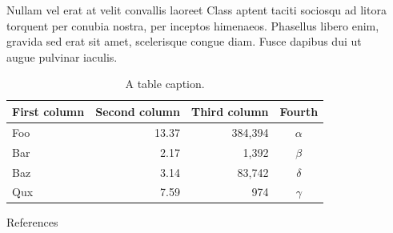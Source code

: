 \documentclass[final]{beamer}
\newlength{\sepwidth}
\newlength{\colwidth}
\newcommand{\separatorcolumn}{\begin{column}{\sepwidth}\end{column}}
\begin{document}
\begin{frame}[t]
\begin{columns}[t]
\begin{column}{\colwidth}
\begin{block}{Nullam vel erat at velit convallis laoreet}
    Class aptent taciti sociosqu ad litora torquent per conubia nostra, per
    inceptos himenaeos. Phasellus libero enim, gravida sed erat sit amet,
    scelerisque congue diam. Fusce dapibus dui ut augue pulvinar iaculis.

    \begin{table}
      \centering
      \begin{tabular}{l r r c}
        \toprule
        \textbf{First column} & \textbf{Second column} & \textbf{Third column} & \textbf{Fourth} \\
        \midrule
        Foo & 13.37 & 384,394 & $\alpha$ \\
        Bar & 2.17 & 1,392 & $\beta$ \\
        Baz & 3.14 & 83,742 & $\delta$ \\
        Qux & 7.59 & 974 & $\gamma$ \\
        \bottomrule
      \end{tabular}
      \caption{A table caption.}
    \end{table}


  \end{block}

  \begin{block}{References}

    \nocite{*}
    \footnotesize{}

  \end{block}

\end{column}

\separatorcolumn
\end{columns}
\end{frame}
\end{document}

